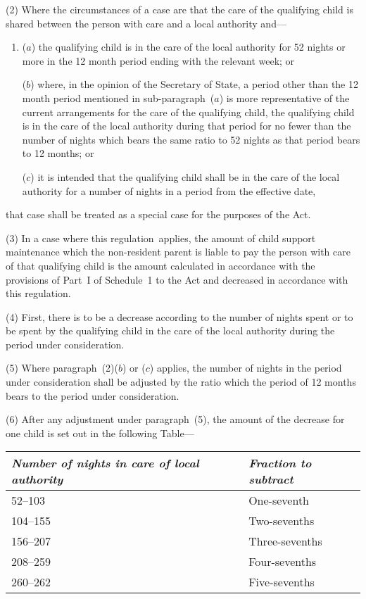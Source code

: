 \documentclass[12pt,a4paper]{article}
\begin{document}
(2) Where the circumstances of a case are that the care of the qualifying child is shared between the person with care and a local authority and—
\begin{enumerate}\item[]
($a$) the qualifying child is in the care of the local authority for 52 nights or more in the 12 month period ending with the relevant week; or

($b$) where, in the opinion of the Secretary of State, a period other than the 12 month period mentioned in sub-paragraph~($a$)  is more representative of the current arrangements for the care of the qualifying child, the qualifying child is in the care of the local authority during that period for no fewer than the number of nights which bears the same ratio to 52 nights as that period bears to 12 months; or%

($c$) it is intended that the qualifying child shall be in the care of the local authority for a number of nights in a period from the effective date,
\end{enumerate}
that case shall be treated as a special case for the purposes of the Act.

(3) In a case where this regulation~applies, the amount of child support maintenance which the non-resident parent is liable to pay the person with care of that qualifying child is the amount calculated in accordance with the provisions of Part~I of Schedule~1 to the Act and decreased in accordance with this regulation.

(4) First, there is to be a decrease according to the number of nights spent or to be spent by the qualifying child in the care of the local authority during the period under consideration.

(5) Where paragraph~(2)($b$)  or ($c$)  applies, the number of nights in the period under consideration shall be adjusted by the ratio which the period of 12 months bears to the period under consideration.

(6) After any adjustment under paragraph~(5), the amount of the decrease for one child is set out in the following Table—

\begin{center}
\footnotesize
\begin{tabular}{ll}
\hline
\itshape Number of nights in care of local authority	& \itshape Fraction to subtract\\
\hline
52–103	&One-seventh\\
104–155	&Two-sevenths\\
156–207	&Three-sevenths\\
208–259	&Four-sevenths\\
260–262	&Five-sevenths\\
\hline
\end{tabular}
\end{center}
\end{document}
